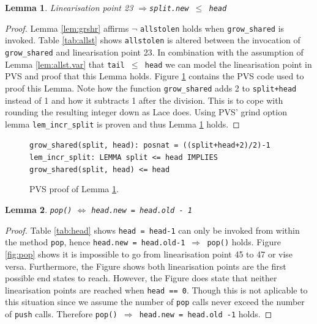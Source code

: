 \documentclass{sig-alternate-br}
\newtheorem{lemma}{Lemma}
\begin{document}
\begin{lemma}
	Linearisation point 23 $\Rightarrow$\texttt{split.new $\leq$ head}
	\label{lem:lin23}
\end{lemma}
\begin{proof}
	Lemma \ref{lem:grshr} affirms $\neg$ \texttt{allstolen} holds when \texttt{grow\_shared} is invoked.
	Table \ref{tab:allst} shows \texttt{allstolen} is altered between the invocation of \texttt{grow\_shared} and linearisation point 23.
	In combination with the assumption of Lemma \ref{lem:allst.var} that \texttt{tail $\leq$ head} we can model the linearisation point in PVS and proof that this Lemma holds.
	Figure \ref{pvs:lin23} contains the PVS code used to proof this Lemma.
	Note how the function \texttt{grow\_shared} adds 2 to \texttt{split+head} instead of 1 and how it subtracts 1 after the division.
	This is to cope with rounding the resulting integer down as Lace does.
	Using PVS' grind option lemma \texttt{lem\_incr\_split} is proven and thus Lemma \ref{lem:lin23} holds.
\end{proof}
\begin{figure}[h]
	\texttt{grow\_shared(split, head): posnat = ((split+head+2)/2)-1}\\
	\texttt{lem\_incr\_split: LEMMA split <= head IMPLIES grow\_shared(split, head) <= head}
	\caption{PVS proof of Lemma \ref{lem:lin23}.}
	\label{pvs:lin23}
\end{figure}

\begin{lemma}
	\texttt{pop()} $\iff$ \texttt{head.new = head.old - 1}
	\label{lem:pop.head}
\end{lemma}
\begin{proof}
	Table \ref{tab:head} shows \texttt{head = head-1} can only be invoked from within the method \texttt{pop}, hence \texttt{head.new = head.old-1 $\Rightarrow$ pop()} holds.
	Figure \ref{fig:pop} shows it is impossible to go from linearisation point 45 to 47 or vise versa. Furthermore, the Figure shows both linearisation points are the first possible end states to reach. However, the Figure does state that neither linearisation points are reached when \texttt{head == 0}. Though this is not aplicable to this situation since we assume the number of \texttt{pop} calls never exceed the number of \texttt{push} calls. Therefore \texttt{pop() $\Rightarrow$ head.new = head.old -1} holds.
\end{proof}
\end{document}
